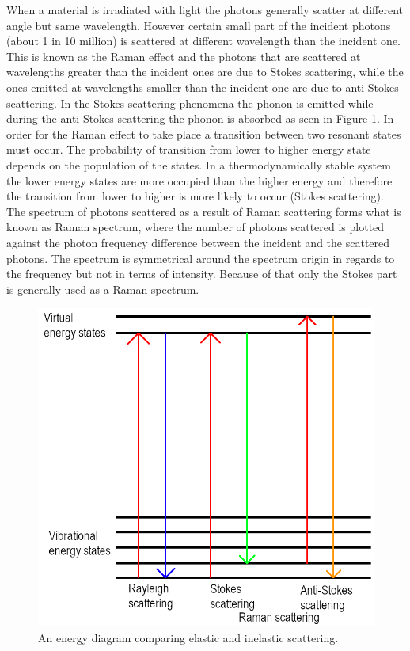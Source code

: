 When a material is irradiated with light the photons generally scatter at different angle but same wavelength. However certain small part of the incident photons (about 1 in 10 million) is scattered at different wavelength than the incident one. This is known as the Raman effect and the photons that are scattered at wavelengths greater than the incident ones are due to Stokes scattering, while the ones emitted at wavelengths smaller than the incident one are due to anti-Stokes scattering. In the Stokes scattering phenomena the phonon is emitted while during the anti-Stokes scattering the phonon is absorbed as seen in Figure \ref{fig:MethodologyRamanEnergyLevels}. In order for the Raman effect to take place a transition between two resonant states must occur. The probability of transition from lower to higher energy state depends on the population of the states. In a thermodynamically stable system the lower energy states are more occupied than the higher energy and therefore the transition from lower to higher is more likely to occur (Stokes scattering). The spectrum of photons scattered as a result of Raman scattering forms what is known as Raman spectrum, where the number of photons scattered is plotted against the photon frequency difference between the incident and the scattered photons. The spectrum is symmetrical around the spectrum origin in regards to the frequency but not in terms of intensity. Because of that only the Stokes part is generally used as a Raman spectrum.

\begin{figure}[!ht]
	\begin{center}
		\includegraphics[scale=0.3]{Methodology/RamanEnergyLevels.png}
		\caption{An energy diagram comparing elastic and inelastic scattering.}
		\label{fig:MethodologyRamanEnergyLevels}
	\end{center}
\end{figure}

